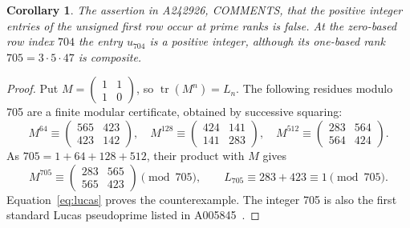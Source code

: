 \documentclass[11pt]{article}
\newtheorem{corollary}[theorem]{Corollary}
\begin{document}
\begin{corollary}\label{cor:primecounterexample}
The assertion in A242926, COMMENTS, that the positive integer entries
of the unsigned first row occur at prime ranks is false.
At the zero-based row index $704$ the entry $u_{704}$ is a positive integer,
although its one-based rank $705=3\cdot5\cdot47$ is composite.
\end{corollary}
\begin{proof}
Put $M=\left(\begin{smallmatrix}1&1\\1&0\end{smallmatrix}\right)$, so
$\operatorname{tr}(M^n)=L_n$. The following residues modulo 705 are a
finite modular certificate, obtained by successive squaring:
\[
 M^{64}\equiv\begin{pmatrix}565&423\\423&142\end{pmatrix},\quad
 M^{128}\equiv\begin{pmatrix}424&141\\141&283\end{pmatrix},\quad
 M^{512}\equiv\begin{pmatrix}283&564\\564&424\end{pmatrix}.
\]
As $705=1+64+128+512$, their product with $M$ gives
\[
 M^{705}\equiv\begin{pmatrix}283&565\\565&423\end{pmatrix}\pmod{705},
 \qquad L_{705}\equiv283+423\equiv1\pmod{705}.
\]
Equation~\eqref{eq:lucas} proves the counterexample. The integer 705 is
also the first standard Lucas pseudoprime listed in A005845~\cite{pseudoprimes}.
\end{proof}
\end{document}
